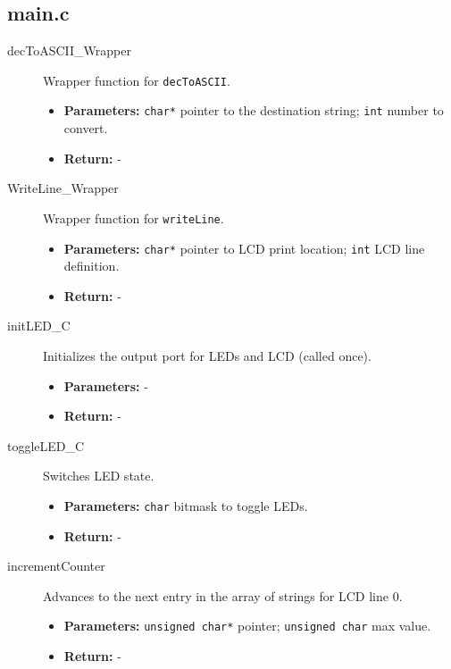 \documentclass[a4paper,12pt]{article}
\begin{document}
\subsection{main.c}

\begin{description}
    \item[decToASCII\_Wrapper] Wrapper function for \texttt{decToASCII}.
    \begin{itemize}
        \item \textbf{Parameters:} \texttt{char*} pointer to the destination string; \texttt{int} number to convert.
        \item \textbf{Return:} -
    \end{itemize}
    
    \item[WriteLine\_Wrapper] Wrapper function for \texttt{writeLine}.
    \begin{itemize}
        \item \textbf{Parameters:} \texttt{char*} pointer to LCD print location; \texttt{int} LCD line definition.
        \item \textbf{Return:} -
    \end{itemize}
    
    \item[initLED\_C] Initializes the output port for LEDs and LCD (called once).
    \begin{itemize}
        \item \textbf{Parameters:} -
        \item \textbf{Return:} -
    \end{itemize}
    
    \item[toggleLED\_C] Switches LED state.
    \begin{itemize}
        \item \textbf{Parameters:} \texttt{char} bitmask to toggle LEDs.
        \item \textbf{Return:} -
    \end{itemize}
    
    \item[incrementCounter] Advances to the next entry in the array of strings for LCD line 0.
    \begin{itemize}
        \item \textbf{Parameters:} \texttt{unsigned char*} pointer; \texttt{unsigned char} max value.
        \item \textbf{Return:} -
    \end{itemize}
    

\end{description}
\end{document}
